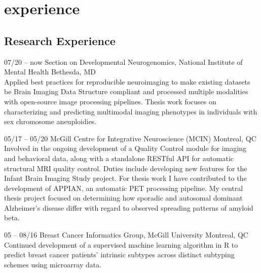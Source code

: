 \documentclass[]{friggeri-cv} %
\begin{document}

\section{experience}

\subsection{Research Experience}

\begin{entrylist}

\entry
{07/20 -- now}
{Section on Developmental Neurogenomics, National Institute of Mental Health}
{Bethesda, MD}
{ \\
Applied best practices for reproducible neuroimaging to make existing datasets be Brain Imaging 
Data Structure compliant and processed multiple modalities with open-source image processing 
pipelines. Thesis work focuses on characterizing and predicting multimodal imaging phenotypes in individuals 
with sex chromosome aneuploidies.}

\entry
{05/17 -- 05/20}
{McGill Centre for Integrative Neuroscience (MCIN)}
{Montreal, QC}
{ \\
Involved in the ongoing development of a Quality Control module for imaging and
behavioral data, along with a standalone RESTful API for automatic structural MRI
quality control. Duties include developing new features for the Infant Brain Imaging
Study project. For thesis work I have contributed to the development of APPIAN, 
an automatic PET processing pipeline. My central thesis project focused on determining 
how sporadic and autosomal dominant Alzheimer's disease differ with regard to observed spreading 
patterns of amyloid beta.}    

\entry
{05 -- 08/16}
{Breast Cancer Informatics Group, McGill University}
{Montreal, QC}
{\\
Continued development of a supervised machine learning algorithm in R to predict
breast cancer patients' intrinsic subtypes across distinct subtyping schemes
using microarray data.}


\end{entrylist}

\end{document}
